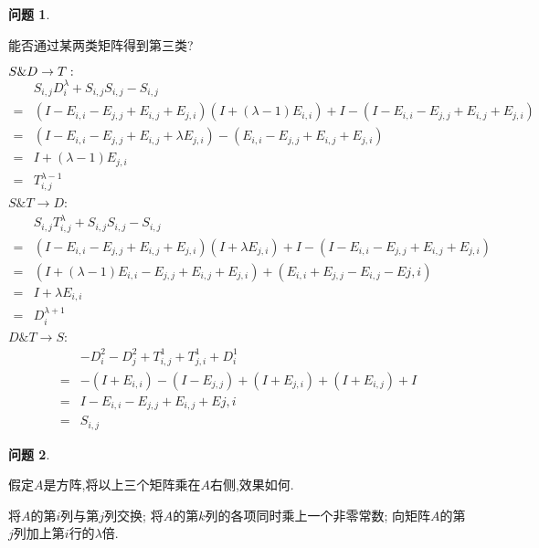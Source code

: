 \documentclass[11pt]{ctexart}
\theoremstyle{definition}
\newtheorem{qqq}{问题}[section]
\numberwithin{equation}{section}
\begin{document}
\begin{qqq}
    \begin{pinked}
        能否通过某两类矩阵得到第三类?
    \end{pinked}
    
\end{qqq}
\begin{aaa}
    $S\& D\to T:\\$
    \begin{align*}
        &S_{i,j}D^\lambda _i+S_{i,j}S_{i,j}-S_{i,j}\\
        =&(I-E_{i,i}-E_{j,j}+E_{i,j}+E_{j,i})(I+(\lambda-1)E_{i,i})+I-(I-E_{i,i}-E_{j,j}+E_{i,j}+E_{j,i})\\
        =&(I-E_{i,i}-E_{j,j}+E_{i,j}+\lambda E_{j,i})-(E_{i,i}-E_{j,j}+E_{i,j}+E_{j,i})\\
        =&I+(\lambda-1)E_{j,i}\\
        =&T^{\lambda-1}_{i,j}
    \end{align*}
    $S \& T \to D$:
    \begin{align*}
        &S_{i,j}T^\lambda _{i,j}+S_{i,j}S_{i,j}-S_{i,j}\\
        =&(I-E_{i,i}-E_{j,j}+E_{i,j}+E_{j,i})(I+\lambda E_{j,i})+I-(I-E_{i,i}-E_{j,j}+E_{i,j}+E_{j,i})\\
        =&(I+(\lambda-1)E_{i,i}-E_{j,j}+E_{i,j}+E_{j,i})+(E_{i,i}+E_{j,j}-E_{i,j}-E{j,i})\\
        =&I+\lambda E_{i,i}\\
        =&D^{\lambda+1}_i
    \end{align*}
    $D \& T \to S$:
    \begin{align*}
        &-D^2_i-D^2_j+T^1_{i,j}+T^1_{j,i}+D^1_i\\
        =&-(I+E_{i,i})-(I-E_{j,j})+(I+E_{j,i})+(I+E_{i,j})+I\\
        =&I-E_{i,i}-E_{j,j}+E_{i,j}+E{j,i}\\
        =&S_{i,j}
    \end{align*}
\end{aaa}
\begin{qqq}
    \begin{pinked}
        假定$A$是方阵,将以上三个矩阵乘在$A$右侧,效果如何.
    \end{pinked}
    
\end{qqq}
\begin{aaa}
    将$A$的第$i$列与第$j$列交换;\newline
    将$A$的第$k$列的各项同时乘上一个非零常数;\newline
    向矩阵$A$的第$j$列加上第$i$行的$\lambda$倍.
\end{aaa}
\end{document}
